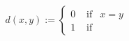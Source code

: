 \documentclass[preview]{standalone}
\begin{document}
\begin{align*}
d(x,y) := \begin{cases}0  &  \text{ if} & x=y \\1 &  \text{ if}\end{cases}
\end{align*}
\end{document}
